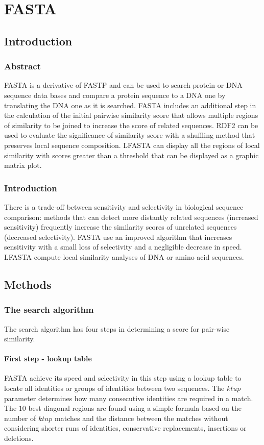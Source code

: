 \graphicspath{{chapters/05/images}}
\chapter{FASTA}

\section{Introduction}

	\subsection{Abstract}
	FASTA is a derivative of FASTP and can be used to search protein or DNA sequence data bases and compare a protein sequence to a DNA one by translating the DNA one as it is searched.
	FASTA includes an additional step in the calculation of the initial pairwise similarity score that allows multiple regions of similarity to be joined to increase the score of related sequences.
	RDF2 can be used to evaluate the significance of similarity score with a shuffling method that preserves local sequence composition.
	LFASTA can display all the regions of local similarity with scores greater than a threshold that can be displayed as a graphic matrix plot.

	\subsection{Introduction}
	There is a trade-off between sensitivity and selectivity in biological sequence comparison: methods that can detect more distantly related sequences (increased sensitivity) frequently increase the similarity scores of unrelated sequences (decreased selectivity).
	FASTA use an improved algorithm that increases sensitivity with a small loss of selectivity and a negligible decrease in speed.
	LFASTA compute local similarity analyses of DNA or amino acid sequences.

\section{Methods}

	\subsection{The search algorithm}
	The search algorithm has four steps in determining a score for pair-wise similarity.

		\subsubsection{First step - lookup table}
		FASTA achieve its speed and selectivity in this step using a lookup table to locate all identities or groups of identities between two sequences.
		The $ktup$ parameter determines how many consecutive identities are required in a match.
		The $10$ best diagonal regions are found using a simple formula based on the number of $ktup$ matches and the distance between the matches without considering shorter runs of identities, conservative replacements, insertions or deletions.

